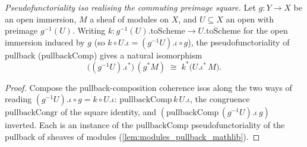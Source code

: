 \begin{definition}
  \label{def:pullback_preimage_iota_iso}
  \textit{Pseudofunctoriality iso realising the commuting preimage square.}
  Let \(g : Y \to X\) be an open immersion, \(M\) a sheaf of modules on \(X\), and \(U \subseteq X\) an
  open with preimage \(g^{-1}(U)\). Writing \(k : g^{-1}(U).\mathrm{toScheme} \to U.\mathrm{toScheme}\) for
  the open immersion induced by \(g\) (so \(k \circ U.\iota = (g^{-1}U).\iota \circ g\)), the
  pseudofunctoriality of pullback (\(\mathrm{pullbackComp}\)) gives a natural isomorphism
  \[
    \bigl((g^{-1}U).\iota^{*}\bigr)\,(g^{*}M) \;\cong\; k^{*}\bigl(U.\iota^{*}\,M\bigr) .
  \]
\end{definition}
\begin{proof}
  Compose the pullback-composition coherence isos along the two ways of reading
  \((g^{-1}U).\iota \circ g = k \circ U.\iota\): \(\mathrm{pullbackComp}\,k\,U.\iota\), the congruence
  \(\mathrm{pullbackCongr}\) of the square identity, and \((\mathrm{pullbackComp}\,(g^{-1}U).\iota\,g)\)
  inverted. Each is an instance of the \(\mathrm{pullbackComp}\) pseudofunctoriality of the pullback of
  sheaves of modules (\cref{lem:modules_pullback_mathlib}).
\end{proof}

